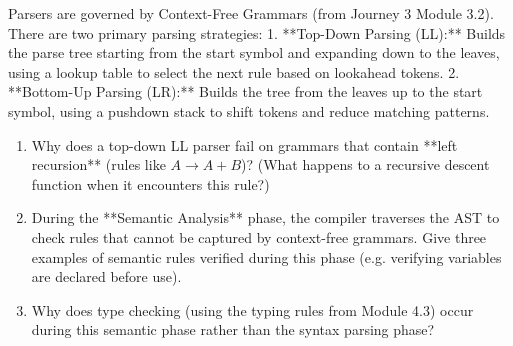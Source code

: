 \documentclass[12pt, a4paper]{book}
\begin{document}
\begin{center}
\end{center}

\begin{explobox}
Parsers are governed by Context-Free Grammars (from Journey 3 Module 3.2). There are two primary parsing strategies:
1. **Top-Down Parsing (LL):** Builds the parse tree starting from the start symbol and expanding down to the leaves, using a lookup table to select the next rule based on lookahead tokens.
2. **Bottom-Up Parsing (LR):** Builds the tree from the leaves up to the start symbol, using a pushdown stack to shift tokens and reduce matching patterns.
\begin{enumerate}[label=(\alph*), leftmargin=*]
  \item Why does a top-down LL parser fail on grammars that contain **left recursion** (rules like $A \to A + B$)? (What happens to a recursive descent function when it encounters this rule?)
  \item During the **Semantic Analysis** phase, the compiler traverses the AST to check rules that cannot be captured by context-free grammars.
        Give three examples of semantic rules verified during this phase (e.g. verifying variables are declared before use).
  \item Why does type checking (using the typing rules from Module 4.3) occur during this semantic phase rather than the syntax parsing phase?
\end{enumerate}
\end{explobox}
\end{document}

